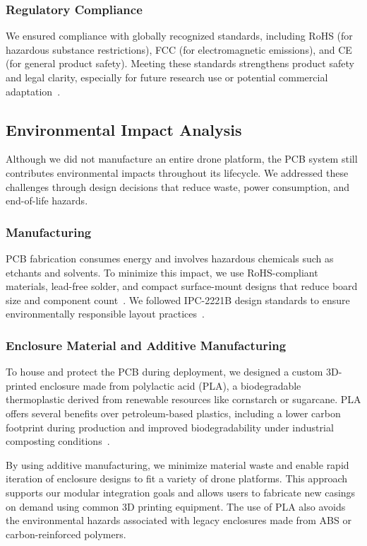 \documentclass[12pt]{article}
\begin{document}
\subsubsection{Regulatory Compliance}

We ensured compliance with globally recognized standards, including RoHS (for hazardous substance restrictions), FCC (for electromagnetic emissions), and CE (for general product safety). Meeting these standards strengthens product safety and legal clarity, especially for future research use or potential commercial adaptation~\cite{ti2023b}.

\subsection{Environmental Impact Analysis}

Although we did not manufacture an entire drone platform, the PCB system still contributes environmental impacts throughout its lifecycle. We addressed these challenges through design decisions that reduce waste, power consumption, and end-of-life hazards.

\subsubsection{Manufacturing}

PCB fabrication consumes energy and involves hazardous chemicals such as etchants and solvents. To minimize this impact, we use RoHS-compliant materials, lead-free solder, and compact surface-mount designs that reduce board size and component count~\cite{ti2023b}. We followed IPC-2221B design standards to ensure environmentally responsible layout practices~\cite{ipc2221b}.

\subsubsection{Enclosure Material and Additive Manufacturing}

To house and protect the PCB during deployment, we designed a custom 3D-printed enclosure made from polylactic acid (PLA), a biodegradable thermoplastic derived from renewable resources like cornstarch or sugarcane. PLA offers several benefits over petroleum-based plastics, including a lower carbon footprint during production and improved biodegradability under industrial composting conditions~\cite{pla2023}.

By using additive manufacturing, we minimize material waste and enable rapid iteration of enclosure designs to fit a variety of drone platforms. This approach supports our modular integration goals and allows users to fabricate new casings on demand using common 3D printing equipment. The use of PLA also avoids the environmental hazards associated with legacy enclosures made from ABS or carbon-reinforced polymers.
\end{document}
